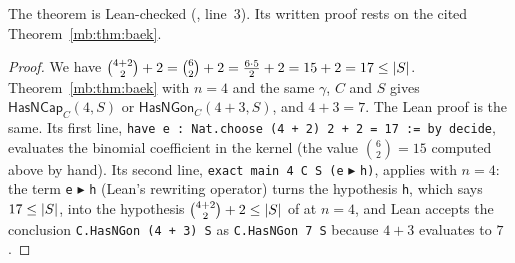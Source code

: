 The theorem is Lean-checked (, line~3). Its written proof rests on the cited
Theorem~\ref{mb:thm:baek}.

\begin{proof}
We have $\binom{4+2}{2}+2=\binom62+2=\frac{6\cdot5}{2}+2=15+2=17\le\lvert S\rvert$. Theorem~\ref{mb:thm:baek} with $n=4$
and the same $\gamma$, $C$ and $S$ gives $\mathsf{HasNCap}_C(4,S)$ or $\mathsf{HasNGon}_C(4+3,S)$, and $4+3=7$. The
Lean proof
is the same. Its first line, \texttt{have e : Nat.choose (4 + 2) 2 + 2 = 17 := by decide}, evaluates the binomial
coefficient in the kernel (the value $\binom62=15$ computed above by hand). Its second line,
\texttt{exact main 4 C S (e} $\blacktriangleright$ \texttt{h)}, applies  with $n=4$: the term
\texttt{e} $\blacktriangleright$ \texttt{h} (Lean's rewriting operator) turns the hypothesis \texttt{h}, which says
$17\le\lvert S\rvert$, into the hypothesis $\binom{4+2}{2}+2\le\lvert S\rvert$ of  at $n=4$, and Lean accepts the
conclusion \mbox{\texttt{C.HasNGon (4 + 3) S}} as \mbox{\texttt{C.HasNGon 7 S}} because $4+3$ evaluates to $7$.
\end{proof}

